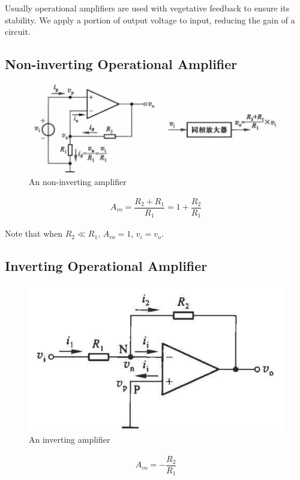 Usually operational amplifiers are used with vegetative feedback to ensure its stability. We apply a portion of output voltage to input, reducing the gain of a circuit.

\subsection{Non-inverting Operational Amplifier}

\begin{figure}[H]
  \centering
  \includegraphics[width=0.9\linewidth]{figures/non-inverting-amplifier}
  \caption{An non-inverting amplifier}
\end{figure}

\begin{equation*}
  \begin{aligned}
    A_{vo} = \dfrac{R_2 + R_1}{R_1} = 1 + \dfrac{R_2}{R_1} 
  \end{aligned}
\end{equation*}

Note that when $R_2\ll R_1$, $A_{vo} = 1$, $v_i = v_o$.

\subsection{Inverting Operational Amplifier}

\begin{figure}[H]
  \centering
  \includegraphics[width=0.6\linewidth]{figures/inverting-amplifier}
  \caption{An inverting amplifier}
\end{figure}

\begin{equation*}
  \begin{aligned}
    A_{vo} = - \dfrac{R_2}{R_1} 
  \end{aligned}
\end{equation*}


